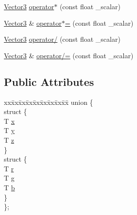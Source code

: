 \begin{DoxyCompactItemize}
\item 
\mbox{\hyperlink{structpad_1_1math_1_1_vector3}{Vector3}} \mbox{\hyperlink{structpad_1_1math_1_1_vector3_a25eb8201c257d3e10e280bb998892575}{operator$\ast$}} (const float \+\_\+scalar)
\item 
\mbox{\hyperlink{structpad_1_1math_1_1_vector3}{Vector3}} \& \mbox{\hyperlink{structpad_1_1math_1_1_vector3_acfa17a2711cc9cc1bec80bf9a5b1c1ba}{operator$\ast$=}} (const float \+\_\+scalar)
\item 
\mbox{\hyperlink{structpad_1_1math_1_1_vector3}{Vector3}} \mbox{\hyperlink{structpad_1_1math_1_1_vector3_a6da03717416e8f24f15c69a195e89734}{operator/}} (const float \+\_\+scalar)
\item 
\mbox{\hyperlink{structpad_1_1math_1_1_vector3}{Vector3}} \& \mbox{\hyperlink{structpad_1_1math_1_1_vector3_a562f20bc51eb5d598acecf4233bb8005}{operator/=}} (const float \+\_\+scalar)
\end{DoxyCompactItemize}
\subsection*{Public Attributes}
\begin{DoxyCompactItemize}
\item 
\begin{tabbing}
xx\=xx\=xx\=xx\=xx\=xx\=xx\=xx\=xx\=\kill
union \{\\
\>struct \{\\
\>\>T \mbox{\hyperlink{structpad_1_1math_1_1_vector3_acf0b6cc0b4fb0a077945332e816e4373}{x}}\\
\>\>T \mbox{\hyperlink{structpad_1_1math_1_1_vector3_af6d815461367ca4c2f85115453470934}{y}}\\
\>\>T \mbox{\hyperlink{structpad_1_1math_1_1_vector3_adcd03301042c390430955427765261e5}{z}}\\
\>\} \\
\>struct \{\\
\>\>T \mbox{\hyperlink{structpad_1_1math_1_1_vector3_a605d25418ec0079b504fcec127e7bea4}{r}}\\
\>\>T \mbox{\hyperlink{structpad_1_1math_1_1_vector3_ab0c584460b01a899fe4504c48c2037e4}{g}}\\
\>\>T \mbox{\hyperlink{structpad_1_1math_1_1_vector3_afaba266e93b4c9f0a14048934ac2f3f6}{b}}\\
\>\} \\
\}; \\

\end{tabbing}\end{DoxyCompactItemize}


